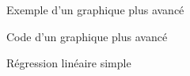 \documentclass[10.5pt,a4paper]{article}
\begin{document}
    \begin{figure}[H]
    \centering
    \caption{Exemple d'un graphique plus avancé}
    \label{revenueDistri}
    \end{figure}
    
     \begin{figure}[H]
    \centering
    \caption{Code d'un graphique plus avancé}
    \label{visCode}
    \end{figure}

  \begin{figure}[H]
    \centering
    \caption{Régression linéaire simple}
    \label{anaReg1}
    \end{figure}
    
\end{document}
